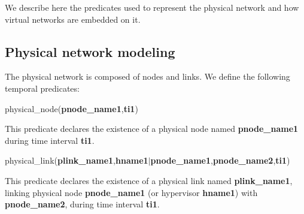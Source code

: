 \label{sec:model-network}
We describe here the predicates used to represent the physical network and how virtual networks are embedded on it.




\subsection{Physical network modeling}


The physical network is composed of nodes and links. We define the following temporal predicates:
\begin{myformula}
physical\_node(\textbf{pnode\_name1},\textbf{ti1})
\end{myformula}

This predicate declares the existence of a physical node named \textbf{pnode\_name1} during time interval \textbf{ti1}.
\begin{myformula}
physical\_link(\textbf{plink\_name1},\textbf{hname1}$\vert$\textbf{pnode\_name1},\textbf{pnode\_name2},\textbf{ti1})
\end{myformula}

This predicate declares the existence of a physical link named \textbf{plink\_name1}, linking physical node \textbf{pnode\_name1} (or hypervisor \textbf{hname1}) with \textbf{pnode\_name2}, during time interval \textbf{ti1}.


